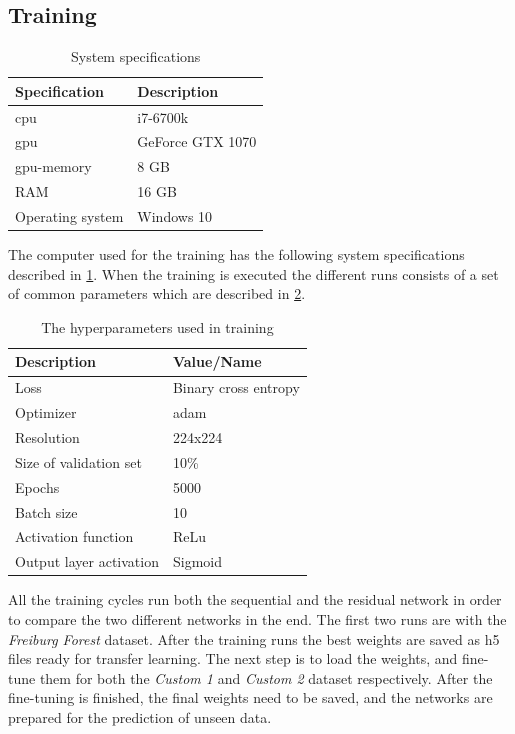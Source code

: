 \documentclass[USenglish]{ifimaster}  %
\begin{document}
\subsection{Training}

\begin{table}[H]
\centering
\begin{tabular}{ll}
\hline
\textbf{Specification} & \textbf{Description} \\ \hline
\ac{cpu} & i7-6700k \\
\ac{gpu} & GeForce GTX 1070  \\
\ac{gpu}-memory & 8 GB  \\
RAM & 16 GB \\
Operating system & Windows 10  \\ \hline
\end{tabular}
\caption{System specifications}
\label{table:system_spec}
\end{table}

The computer used for the training has the following system specifications described in \cref{table:system_spec}.
When the training is executed the different runs consists of a set of common parameters which are described in \cref{table:hyperparameters}. 

\begin{table}[H]
\centering
\begin{tabular}{ll}
\hline
\textbf{Description} & \textbf{Value/Name}  \\ \hline
Loss &  Binary cross entropy\\
Optimizer &  adam \\
Resolution & 224x224 \\
Size of validation set & 10\%  \\
Epochs &  5000 \\ 
Batch size & 10\\
Activation function & ReLu\\
Output layer activation & Sigmoid \\ \hline
\end{tabular}
\caption{The hyperparameters used in training}
\label{table:hyperparameters}
\end{table}

All the training cycles run both the sequential and the residual network in order to compare the two different networks in the end. The first two runs are with the \textit{Freiburg Forest} dataset. After the training runs the best weights are saved as h5 files ready for transfer learning. The next step is to load the weights, and fine-tune them for both the \textit{Custom 1} and \textit{Custom 2} dataset respectively. After the fine-tuning is finished, the final weights need to be saved, and the networks are prepared for the prediction of unseen data. 
\end{document}
